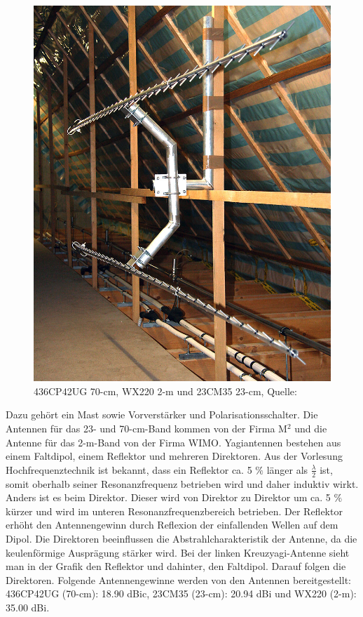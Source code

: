 \begin{figure}[h]
\begin{minipage}[t]{0.2\textwidth}
		\includegraphics[width=\textwidth]{images/antenne3}
	\end{minipage}
	\caption[Antennen]{436CP42UG 70-cm, WX220 2-m und 23CM35 23-cm, Quelle: \cite{dk0te}}
	\label{fig: antennen}
\end{figure}
\newpar
Dazu gehört ein Mast sowie Vorverstärker und Polarisationsschalter. Die Antennen für das 23- und 70-cm-Band kommen von der Firma M$^2$ und die 
Antenne für das 2-m-Band von der Firma WIMO. Yagiantennen bestehen aus einem Faltdipol, einem Reflektor und mehreren Direktoren. Aus der Vorlesung 
Hochfrequenztechnik \cite{hfscript} ist bekannt, dass ein Reflektor ca. 5 $\%$ länger als $\frac{\lambda}{2}$ ist, somit oberhalb seiner 
Resonanzfrequenz betrieben wird und daher induktiv wirkt.  Anders ist es beim Direktor. Dieser wird von Direktor zu Direktor um ca. 5 $\%$ kürzer und 
wird im unteren Resonanzfrequenzbereich betrieben. Der Reflektor erhöht den Antennengewinn durch Reflexion der einfallenden Wellen auf dem Dipol. Die 
Direktoren beeinflussen die Abstrahlcharakteristik der Antenne, da die keulenförmige Ausprägung stärker wird. Bei der linken Kreuzyagi-Antenne sieht 
man in der Grafik den Reflektor und dahinter, den Faltdipol. Darauf folgen die Direktoren. Folgende Antennengewinne werden von den Antennen 
bereitgestellt: 436CP42UG (70-cm): 18.90 dBic, 23CM35 (23-cm): 20.94 dBi und WX220 (2-m): 35.00 dBi.

